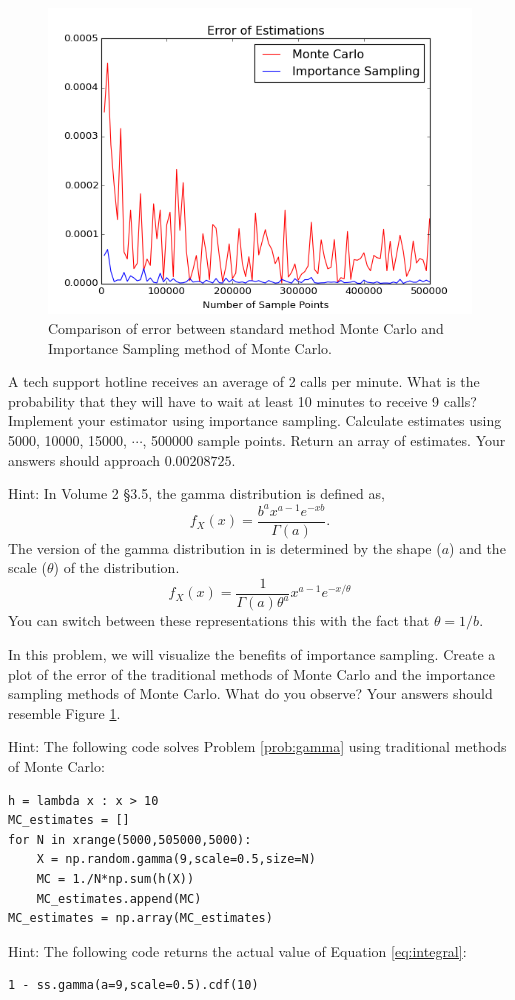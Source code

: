 \begin{figure}[H]
\includegraphics[width=\textwidth]{MCvsIS.png}
\caption{Comparison of error between standard method Monte Carlo and Importance Sampling method of Monte Carlo.}
\label{fig:compare}
\end{figure}

\begin{problem} \label{prob:gamma}
A tech support hotline receives an average of 2 calls per minute. What is the probability that they will have to wait at least 10 minutes to receive 9 calls? Implement your estimator using importance sampling. Calculate estimates using 5000, 10000, 15000, $\cdots$, 500000 sample points. Return an array of estimates. Your answers should approach $0.00208725$. 

Hint: In Volume 2 \S 3.5, the gamma distribution is defined as, $$f_X(x) = \frac{b^{a}x^{a-1}e^{-xb}}{\Gamma(a)}.$$ The version of the gamma distribution in  is determined by the shape ($a$) and the scale ($\theta$) of the distribution. $$f_X(x) = \frac{1}{\Gamma(a)\theta^a}x^{a-1}e^{-x/\theta}$$
You can switch between these representations this with the fact that $\theta = 1/b$.
\end{problem}

\begin{problem}
In this problem, we will visualize the benefits of importance sampling. Create a plot of the error of the traditional methods of Monte Carlo and the importance sampling methods of Monte Carlo. What do you observe? Your answers should resemble Figure \ref{fig:compare}.

Hint: The following code solves Problem \ref{prob:gamma} using traditional methods of Monte Carlo:
\begin{lstlisting}
h = lambda x : x > 10
MC_estimates = []
for N in xrange(5000,505000,5000):
    X = np.random.gamma(9,scale=0.5,size=N)
    MC = 1./N*np.sum(h(X))    
    MC_estimates.append(MC)
MC_estimates = np.array(MC_estimates)
\end{lstlisting}

Hint: The following code returns the actual value of Equation \ref{eq:integral}:
\begin{lstlisting}
1 - ss.gamma(a=9,scale=0.5).cdf(10)
\end{lstlisting}
\end{problem}

